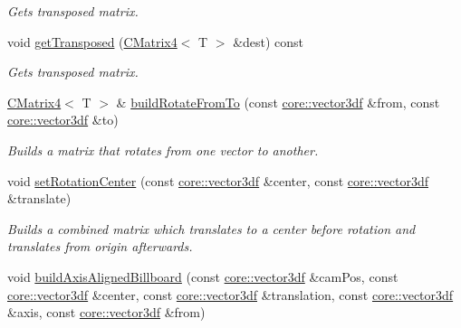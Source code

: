 \begin{DoxyCompactItemize}
\begin{DoxyCompactList}\small\item\em Gets transposed matrix. \end{DoxyCompactList}\item 
void \hyperlink{classirr_1_1core_1_1CMatrix4_abc4f641ad798591424020e38efe21636}{get\+Transposed} (\hyperlink{classirr_1_1core_1_1CMatrix4}{C\+Matrix4}$<$ T $>$ \&dest) const \hypertarget{classirr_1_1core_1_1CMatrix4_abc4f641ad798591424020e38efe21636}{}\label{classirr_1_1core_1_1CMatrix4_abc4f641ad798591424020e38efe21636}

\begin{DoxyCompactList}\small\item\em Gets transposed matrix. \end{DoxyCompactList}\item 
\hyperlink{classirr_1_1core_1_1CMatrix4}{C\+Matrix4}$<$ T $>$ \& \hyperlink{classirr_1_1core_1_1CMatrix4_a4802c6a89ad813e2919f68f512fb320f}{build\+Rotate\+From\+To} (const \hyperlink{namespaceirr_1_1core_a06f169d08b5c429f5575acb7edbad811}{core\+::vector3df} \&from, const \hyperlink{namespaceirr_1_1core_a06f169d08b5c429f5575acb7edbad811}{core\+::vector3df} \&to)
\begin{DoxyCompactList}\small\item\em Builds a matrix that rotates from one vector to another. \end{DoxyCompactList}\item 
void \hyperlink{classirr_1_1core_1_1CMatrix4_a8117628146ce654b3b292af7c49e25e2}{set\+Rotation\+Center} (const \hyperlink{namespaceirr_1_1core_a06f169d08b5c429f5575acb7edbad811}{core\+::vector3df} \&center, const \hyperlink{namespaceirr_1_1core_a06f169d08b5c429f5575acb7edbad811}{core\+::vector3df} \&translate)
\begin{DoxyCompactList}\small\item\em Builds a combined matrix which translates to a center before rotation and translates from origin afterwards. \end{DoxyCompactList}\item 
void \hyperlink{classirr_1_1core_1_1CMatrix4_ad2dc80f2aed15900839389cf52f9e798}{build\+Axis\+Aligned\+Billboard} (const \hyperlink{namespaceirr_1_1core_a06f169d08b5c429f5575acb7edbad811}{core\+::vector3df} \&cam\+Pos, const \hyperlink{namespaceirr_1_1core_a06f169d08b5c429f5575acb7edbad811}{core\+::vector3df} \&center, const \hyperlink{namespaceirr_1_1core_a06f169d08b5c429f5575acb7edbad811}{core\+::vector3df} \&translation, const \hyperlink{namespaceirr_1_1core_a06f169d08b5c429f5575acb7edbad811}{core\+::vector3df} \&axis, const \hyperlink{namespaceirr_1_1core_a06f169d08b5c429f5575acb7edbad811}{core\+::vector3df} \&from)

\end{DoxyCompactItemize}
